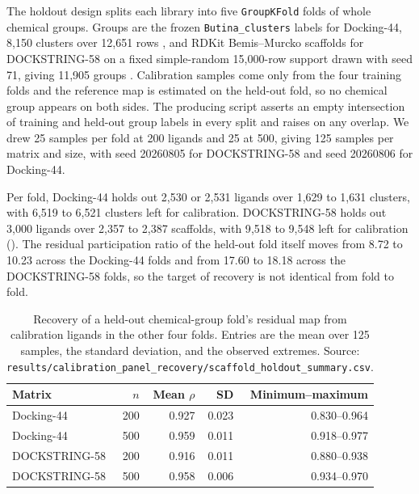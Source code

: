 The holdout design splits each library into five \texttt{GroupKFold} folds of whole chemical
groups. Groups are the frozen \texttt{Butina\_clusters} labels for Docking-44, 8{,}150 clusters
over 12{,}651 rows \cite{butina1999}, and RDKit Bemis--Murcko scaffolds for DOCKSTRING-58 on a
fixed simple-random 15{,}000-row support drawn with seed 71, giving 11{,}905 groups
\cite{murcko1996,rdkit2025}. Calibration samples come only from the four training folds and the
reference map is estimated on the held-out fold, so no chemical group appears on both sides. The
producing script asserts an empty intersection of training and held-out group labels in every
split and raises on any overlap. We drew 25 samples per fold at 200 ligands and 25 at 500, giving
125 samples per matrix and size, with seed 20260805 for DOCKSTRING-58 and seed 20260806 for
Docking-44.

Per fold, Docking-44 holds out 2{,}530 or 2{,}531 ligands over 1{,}629 to 1{,}631 clusters, with
6{,}519 to 6{,}521 clusters left for calibration. DOCKSTRING-58 holds out 3{,}000 ligands over
2{,}357 to 2{,}387 scaffolds, with 9{,}518 to 9{,}548 left for calibration
(). The residual
participation ratio of the held-out fold itself moves from 8.72 to 10.23 across the Docking-44
folds and from 17.60 to 18.18 across the DOCKSTRING-58 folds, so the target of recovery is not
identical from fold to fold.

\begin{table}[htbp]
\centering
\caption{Recovery of a held-out chemical-group fold's residual map from calibration ligands in
the other four folds. Entries are the mean over 125 samples, the standard deviation, and the
observed extremes. Source:
\texttt{results/calibration\_panel\_recovery/scaffold\_holdout\_summary.csv}.}
\label{tab:s5group}
\small
\begin{tabular}{lrrrr}
\toprule
Matrix & $n$ & Mean $\rho$ & SD & Minimum--maximum \\
\midrule
Docking-44 & 200 & 0.927 & 0.023 & 0.830--0.964 \\
Docking-44 & 500 & 0.959 & 0.011 & 0.918--0.977 \\
DOCKSTRING-58 & 200 & 0.916 & 0.011 & 0.880--0.938 \\
DOCKSTRING-58 & 500 & 0.958 & 0.006 & 0.934--0.970 \\
\bottomrule
\end{tabular}
\end{table}

